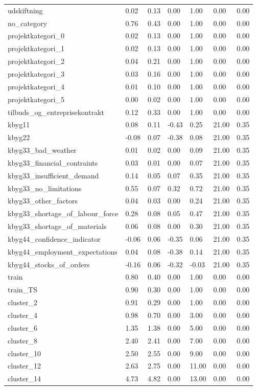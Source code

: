\begin{landscape}
\begin{longtable}[h!]{lllllll}
udskiftning & 0.02 & 0.13 & 0.00 & 1.00 & 0.00 & 0.00 \\
no_category & 0.76 & 0.43 & 0.00 & 1.00 & 0.00 & 0.00 \\
projektkategori_0 & 0.02 & 0.13 & 0.00 & 1.00 & 0.00 & 0.00 \\
projektkategori_1 & 0.02 & 0.13 & 0.00 & 1.00 & 0.00 & 0.00 \\
projektkategori_2 & 0.04 & 0.21 & 0.00 & 1.00 & 0.00 & 0.00 \\
projektkategori_3 & 0.03 & 0.16 & 0.00 & 1.00 & 0.00 & 0.00 \\
projektkategori_4 & 0.01 & 0.10 & 0.00 & 1.00 & 0.00 & 0.00 \\
projektkategori_5 & 0.00 & 0.02 & 0.00 & 1.00 & 0.00 & 0.00 \\
tilbuds_og_entreprisekontrakt & 0.12 & 0.33 & 0.00 & 1.00 & 0.00 & 0.00 \\
kbyg11 & 0.08 & 0.11 & -0.43 & 0.25 & 21.00 & 0.35 \\
kbyg22 & -0.08 & 0.07 & -0.38 & 0.08 & 21.00 & 0.35 \\
kbyg33_bad_weather & 0.01 & 0.02 & 0.00 & 0.09 & 21.00 & 0.35 \\
kbyg33_financial_contraints & 0.03 & 0.01 & 0.00 & 0.07 & 21.00 & 0.35 \\
kbyg33_insufficient_demand & 0.14 & 0.05 & 0.07 & 0.35 & 21.00 & 0.35 \\
kbyg33_no_limitations & 0.55 & 0.07 & 0.32 & 0.72 & 21.00 & 0.35 \\
kbyg33_other_factors & 0.04 & 0.03 & 0.00 & 0.24 & 21.00 & 0.35 \\
kbyg33_shortage_of_labour_force & 0.28 & 0.08 & 0.05 & 0.47 & 21.00 & 0.35 \\
kbyg33_shortage_of_materials & 0.06 & 0.08 & 0.00 & 0.30 & 21.00 & 0.35 \\
kbyg44_confidence_indicator & -0.06 & 0.06 & -0.35 & 0.06 & 21.00 & 0.35 \\
kbyg44_employment_expectations & 0.04 & 0.08 & -0.38 & 0.14 & 21.00 & 0.35 \\
kbyg44_stocks_of_orders & -0.16 & 0.06 & -0.32 & -0.03 & 21.00 & 0.35 \\
train & 0.80 & 0.40 & 0.00 & 1.00 & 0.00 & 0.00 \\
train_TS & 0.90 & 0.30 & 0.00 & 1.00 & 0.00 & 0.00 \\
cluster_2 & 0.91 & 0.29 & 0.00 & 1.00 & 0.00 & 0.00 \\
cluster_4 & 0.98 & 0.70 & 0.00 & 3.00 & 0.00 & 0.00 \\
cluster_6 & 1.35 & 1.38 & 0.00 & 5.00 & 0.00 & 0.00 \\
cluster_8 & 2.40 & 2.41 & 0.00 & 7.00 & 0.00 & 0.00 \\
cluster_10 & 2.50 & 2.55 & 0.00 & 9.00 & 0.00 & 0.00 \\
cluster_12 & 2.63 & 2.75 & 0.00 & 11.00 & 0.00 & 0.00 \\
cluster_14 & 4.73 & 4.82 & 0.00 & 13.00 & 0.00 & 0.00 \\
\end{longtable}\end{landscape}
